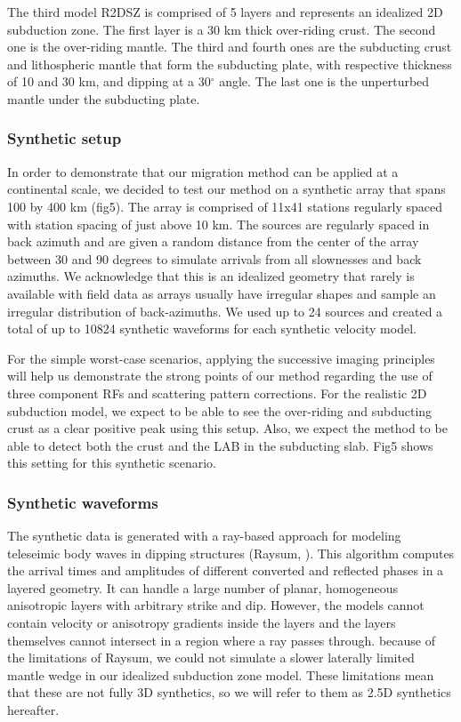\documentclass[9pt,a4paper]{article}
\numberwithin{equation}{section}
\begin{document}
\begin{multicols}{2}
The third model R2DSZ is comprised of 5 layers and represents an idealized 2D subduction zone.
The first layer is a 30 km thick over-riding crust.
The second one is the over-riding mantle.
The third and fourth ones are the subducting crust and lithospheric mantle that form the subducting plate, with respective thickness of 10 and 30 km,  and dipping at a 30$^{\circ}$ angle.
The last one is the unperturbed mantle under the subducting plate.

\subsubsection{Synthetic setup}

In order to demonstrate that our migration method can be applied at a continental scale, we decided to test our method on a synthetic array that spans 100 by 400 km (fig5).
The array is comprised of 11x41 stations regularly spaced with station spacing of just above 10 km.
The sources are regularly spaced in back azimuth and are given a random distance from the center of the array between 30 and 90 degrees to simulate arrivals from all slownesses and back azimuths.
We acknowledge that this is an idealized geometry that rarely is available with field data as arrays usually have irregular shapes and sample an irregular distribution of back-azimuths.
We used up to 24 sources and created a total of up to 10824 synthetic waveforms for each synthetic velocity model.

For the simple worst-case scenarios, applying the successive imaging principles will help us demonstrate the strong points of our method regarding the use of three component RFs and scattering pattern corrections.
For the realistic 2D subduction model, we expect to be able to see the over-riding and subducting crust as a clear positive peak using this setup.
Also, we expect the method to be able to detect both the crust and the LAB in the subducting slab.
Fig5 shows this setting for this synthetic scenario.

\subsubsection{Synthetic waveforms}

The synthetic data is generated with a ray-based approach for modeling teleseimic body waves in dipping structures (Raysum, \cite{fred_gji_00}).
This algorithm computes the arrival times and amplitudes of different converted and reflected phases in a layered geometry.
It can handle a large number of planar, homogeneous anisotropic layers with arbitrary strike and dip.
However, the models cannot contain velocity or anisotropy gradients inside the layers and the layers themselves cannot intersect in a region where a ray passes through.
because of the limitations of Raysum, we could not simulate a slower laterally limited mantle wedge in our idealized subduction zone model.
These limitations mean that these are not fully 3D synthetics, so we will refer to them as 2.5D synthetics hereafter.


\end{multicols}
\end{document}
